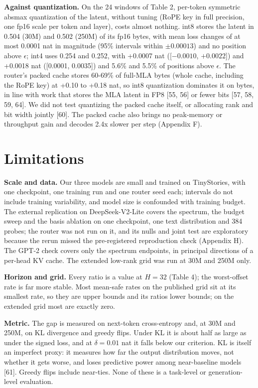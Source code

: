 \documentclass[10pt]{article}
\begin{document}
\textbf{Against quantization.} On the 24 windows of Table 2, per-token symmetric absmax quantization of the latent, without tuning (RoPE key in full precision, one fp16 scale per token and layer), costs almost nothing. int8 stores the latent in 0.504 (30M) and 0.502 (250M) of its fp16 bytes, with mean loss changes of at most 0.0001 nat in magnitude (95\% intervals within $\pm0.00013$) and no position above $\epsilon$; int4 uses 0.254 and 0.252, with +0.0007 nat ([$-0.0010$, $+0.0022$]) and +0.0018 nat ([0.0001, 0.0035]) and 5.6\% and 5.5\% of positions above $\epsilon$. The router's packed cache stores 60-69\% of full-MLA bytes (whole cache, including the RoPE key) at +0.10 to +0.18 nat, so int8 quantization dominates it on bytes, in line with work that stores the MLA latent in FP8 [55, 56] or fewer bits [57, 58, 59, 64]. We did not test quantizing the packed cache itself, or allocating rank and bit width jointly [60]. The packed cache also brings no peak-memory or throughput gain and decodes 2.4x slower per step (Appendix F).

\section{Limitations}

\textbf{Scale and data.} Our three models are small and trained on TinyStories, with one checkpoint, one training run and one router seed each; intervals do not include training variability, and model size is confounded with training budget. The external replication on DeepSeek-V2-Lite covers the spectrum, the budget sweep and the basis ablation on one checkpoint, one text distribution and 384 probes; the router was not run on it, and its nulls and joint test are exploratory because the rerun missed the pre-registered reproduction check (Appendix H). The GPT-2 check covers only the spectrum endpoints, in principal directions of a per-head KV cache. The extended low-rank grid was run at 30M and 250M only.

\textbf{Horizon and grid.} Every ratio is a value at $H=32$ (Table 4); the worst-offset rate is far more stable. Most mean-safe rates on the published grid sit at its smallest rate, so they are upper bounds and its ratios lower bounds; on the extended grid most are exactly zero.

\textbf{Metric.} The gap is measured on next-token cross-entropy and, at 30M and 250M, on KL divergence and greedy flips. Under KL it is about half as large as under the signed loss, and at $\delta=0.01$ nat it falls below our criterion. KL is itself an imperfect proxy: it measures how far the output distribution moves, not whether it gets worse, and loses predictive power among near-baseline models [61]. Greedy flips include near-ties. None of these is a task-level or generation-level evaluation.
\end{document}
